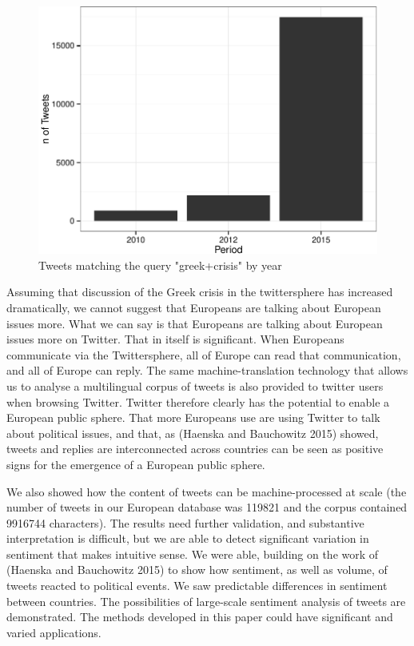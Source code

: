 \documentclass[]{article}
\begin{document}
\begin{figure}

{\centering \includegraphics{fin_paper_files/figure-latex/unnamed-chunk-19-1} 

}

\caption{Tweets matching the query "greek+crisis" by year}\label{fig:unnamed-chunk-19}
\end{figure}

Assuming that discussion of the Greek crisis in the twittersphere has
increased dramatically, we cannot suggest that Europeans are talking
about European issues more. What we can say is that Europeans are
talking about European issues more on Twitter. That in itself is
significant. When Europeans communicate via the Twittersphere, all of
Europe can read that communication, and all of Europe can reply. The
same machine-translation technology that allows us to analyse a
multilingual corpus of tweets is also provided to twitter users when
browsing Twitter. Twitter therefore clearly has the potential to enable
a European public sphere. That more Europeans use are using Twitter to
talk about political issues, and that, as (Haenska and Bauchowitz 2015)
showed, tweets and replies are interconnected across countries can be
seen as positive signs for the emergence of a European public sphere.

We also showed how the content of tweets can be machine-processed at
scale (the number of tweets in our European database was 119821 and the
corpus contained 9916744 characters). The results need further
validation, and substantive interpretation is difficult, but we are able
to detect significant variation in sentiment that makes intuitive sense.
We were able, building on the work of (Haenska and Bauchowitz 2015) to
show how sentiment, as well as volume, of tweets reacted to political
events. We saw predictable differences in sentiment between countries.
The possibilities of large-scale sentiment analysis of tweets are
demonstrated. The methods developed in this paper could have significant
and varied applications.
\end{document}
